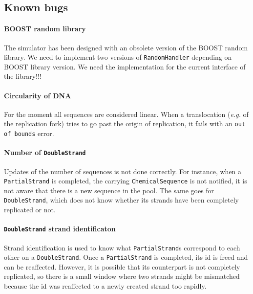 \subsection{Known bugs}

\paragraph{BOOST random library} The simulator has been designed with an obsolete version of the BOOST random library. We need to implement two versions of \texttt{RandomHandler} depending on BOOST library version. We need the implementation for the current interface of the library!!!

\paragraph{Circularity of DNA} For the moment all sequences are considered linear. When a translocation (\textit{e.g.} of the replication fork) tries to go past the origin of replication, it fails with an \texttt{out of bounds} error.

\paragraph{Number of \texttt{DoubleStrand}} Updates of the number of sequences is not done correctly. For instance, when a \texttt{PartialStrand} is completed, the carrying \texttt{ChemicalSequence} is not notified, it is not aware that there is a new sequence in the pool. The same goes for \texttt{DoubleStrand}, which does not know whether its strands have been completely replicated or not.

\paragraph{\texttt{DoubleStrand} strand identificaton} Strand identification is used to know what \texttt{PartialStrand}s correspond to each other on a \texttt{DoubleStrand}. Once a \texttt{PartialStrand} is completed, its id is freed and can be reaffected. However, it is possible that its counterpart is not completely replicated, so there is a small window where two strands might be mismatched because the id was reaffected to a newly created strand too rapidly.

